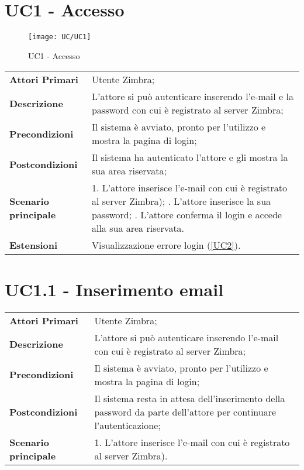 \section{UC1 - Accesso}
\begin{figure}[H] 
	\centering
	\texttt{[image: UC/UC1]}
	\caption{UC1 - Accesso}
\end{figure}
\begin{center}
	\bgroup
	\def\arraystretch{1.8}     
	\begin{longtable}{  p{4cm} | p{9.5cm} } 
		\textbf{Attori Primari} & Utente Zimbra; \\ 
		\textbf{Descrizione} & L’attore si può autenticare inserendo l'e-mail e la password con cui è registrato al server Zimbra; \\ 
		\textbf{Precondizioni}  & Il sistema è avviato, pronto per l’utilizzo e mostra la pagina di login; \\
		\textbf{Postcondizioni} & Il sistema ha autenticato l’attore e gli mostra la sua area riservata;  \\ 
		\textbf{Scenario principale} & 
		1. L’attore inserisce l'e-mail con cui è registrato al server Zimbra); \newline
		2. L’attore inserisce la sua password; \newline
		3. L’attore conferma il login e accede alla sua area riservata.\\
		\textbf{Estensioni} & Visualizzazione errore login (\ref{UC2}).
	\end{longtable}
	\egroup
\end{center}

\section{UC1.1 - Inserimento email}
\begin{center}
	\bgroup
	\def\arraystretch{1.8}     
	\begin{longtable}{  p{4cm} | p{9.5cm} } 
		\textbf{Attori Primari} & Utente Zimbra; \\ 
		\textbf{Descrizione} & L’attore si può autenticare inserendo l'e-mail con cui è registrato al server Zimbra; \\ 
		\textbf{Precondizioni}  & Il sistema è avviato, pronto per l’utilizzo e mostra la pagina di login; \\
		\textbf{Postcondizioni} & Il sistema resta in attesa dell'inserimento della password da parte dell'attore per continuare l'autenticazione;  \\ 
		\textbf{Scenario principale} & 
		1. L’attore inserisce l'e-mail con cui è registrato al server Zimbra).
	\end{longtable}
	\egroup
\end{center}
